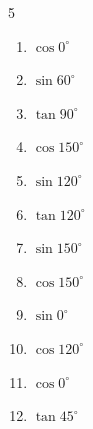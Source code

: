 \begin{multicols}{5}
\begin{enumerate}

  \item $\displaystyle \cos{0^\circ}$

        \phantom{$\displaystyle =1$}

  \item $\displaystyle \sin{60^\circ}$


  \item $\displaystyle \tan{90^\circ}$

        \phantom{$\displaystyle なし$}

  \item $\displaystyle \cos{150^\circ}$


  \item $\displaystyle \sin{120^\circ}$


  \item $\displaystyle \tan{120^\circ}$


  \item $\displaystyle \sin{150^\circ}$


\columnbreak %

  \item $\displaystyle \cos{150^\circ}$


  \item $\displaystyle \sin{0^\circ}$

        \phantom{$\displaystyle =0$}

  \item $\displaystyle \cos{120^\circ}$


  \item $\displaystyle \cos{0^\circ}$

        \phantom{$\displaystyle =1$}

  \item $\displaystyle \tan{45^\circ}$

        \phantom{$\displaystyle =1$}


\end{enumerate}
\end{multicols}
